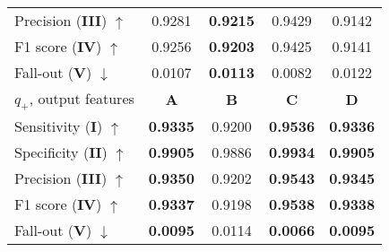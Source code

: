 \documentclass[superscriptaddress,longbibliography,aps,prl,twocolumn,10pt]{revtex4-2}
\begin{document}
\begin{table}[t]
{\begin{tabular}{lcccc}
Precision (\textbf{III}) $\uparrow$ & 0.9281 & \textbf{0.9215} & 0.9429 & 0.9142 \\
F1 score (\textbf{IV}) $\uparrow$ & 0.9256 & \textbf{0.9203} & 0.9425 & 0.9141 \\
Fall-out (\textbf{V}) $\downarrow$ & 0.0107 & \textbf{0.0113} & 0.0082 & 0.0122 \\
\hline
$q_+$, output features & \textbf{A} & \textbf{B} & \textbf{C} & \textbf{D} \\
Sensitivity (\textbf{I}) $\uparrow$ & \textbf{0.9335} & 0.9200 & \textbf{0.9536} & \textbf{0.9336} \\
Specificity (\textbf{II}) $\uparrow$ & \textbf{0.9905} & 0.9886 & \textbf{0.9934} & \textbf{0.9905} \\
Precision (\textbf{III}) $\uparrow$ & \textbf{0.9350} & 0.9202 & \textbf{0.9543} & \textbf{0.9345} \\
F1 score (\textbf{IV}) $\uparrow$ & \textbf{0.9337} & 0.9198 & \textbf{0.9538} & \textbf{0.9338} \\
Fall-out (\textbf{V}) $\downarrow$ & \textbf{0.0095} & 0.0114 & \textbf{0.0066} & \textbf{0.0095} \\
\bottomrule
\end{tabular}}
\label{tab:ml_comp1}
\end{table}
\end{document}
